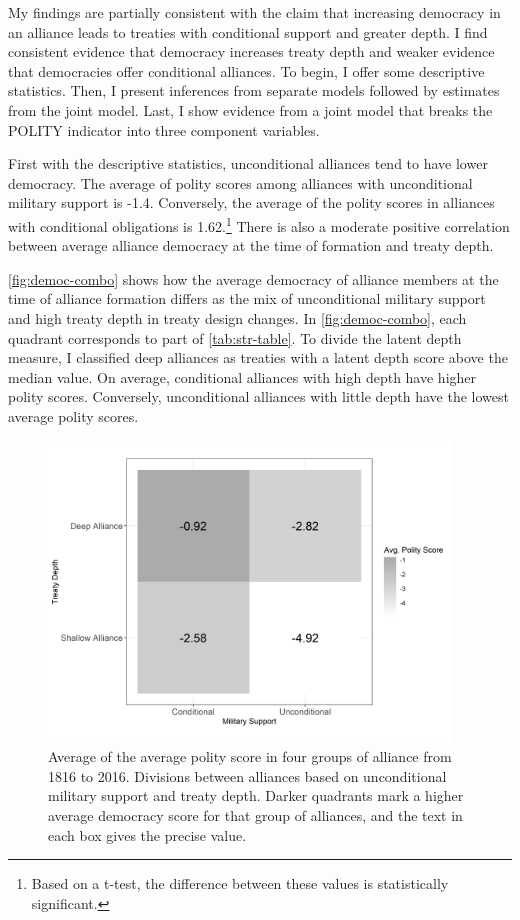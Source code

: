 \documentclass[12pt]{article}
\begin{document}
My findings are partially consistent with the claim that increasing democracy in an alliance leads to treaties with conditional support and greater depth. 
I find consistent evidence that democracy increases treaty depth and weaker evidence that democracies offer conditional alliances. 
To begin, I offer some descriptive statistics.
Then, I present inferences from separate models followed by estimates from the joint model. 
Last, I show evidence from a joint model that breaks the POLITY indicator into three component variables. 


First with the descriptive statistics, unconditional alliances tend to have lower democracy. 
The average of polity scores among alliances with unconditional military support is -1.4. 
Conversely, the average of the polity scores in alliances with conditional obligations is 1.62.\footnote{Based on a t-test, the difference between these values is statistically significant.} 
There is also a moderate positive correlation between average alliance democracy at the time of formation and treaty depth. 


\autoref{fig:democ-combo} shows how the average democracy of alliance members at the time of alliance formation differs as the mix of unconditional military support and high treaty depth in treaty design changes.
In \autoref{fig:democ-combo}, each quadrant corresponds to part of \autoref{tab:str-table}.
To divide the latent depth measure, I classified deep alliances as treaties with a latent depth score above the median value. 
On average, conditional alliances with high depth have higher polity scores. 
Conversely, unconditional alliances with little depth have the lowest average polity scores. 


\begin{figure}[hbtp]
\centering
\includegraphics[width=0.95\textwidth]{../figures/democ-combo.png}
\caption{Average of the average polity score in four groups of alliance from 1816 to 2016. Divisions between alliances based on unconditional military support and treaty depth. Darker quadrants mark a higher average democracy score for that group of alliances, and the text in each box gives the precise value. }
\label{fig:democ-combo}
\end{figure}
\end{document}
